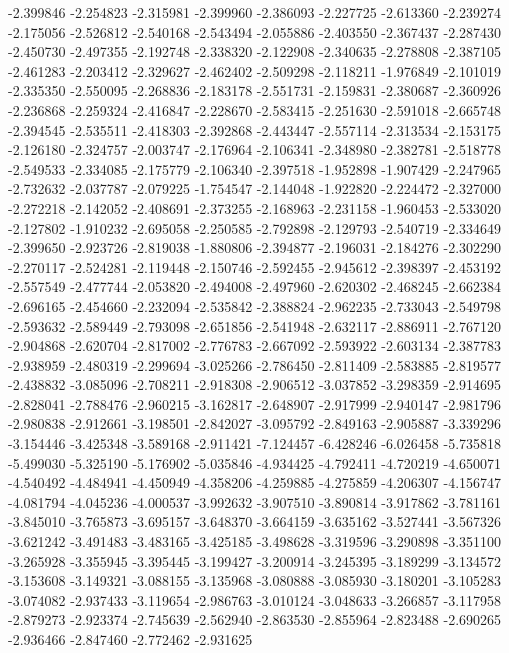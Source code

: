 -2.399846
-2.254823
-2.315981
-2.399960
-2.386093
-2.227725
-2.613360
-2.239274
-2.175056
-2.526812
-2.540168
-2.543494
-2.055886
-2.403550
-2.367437
-2.287430
-2.450730
-2.497355
-2.192748
-2.338320
-2.122908
-2.340635
-2.278808
-2.387105
-2.461283
-2.203412
-2.329627
-2.462402
-2.509298
-2.118211
-1.976849
-2.101019
-2.335350
-2.550095
-2.268836
-2.183178
-2.551731
-2.159831
-2.380687
-2.360926
-2.236868
-2.259324
-2.416847
-2.228670
-2.583415
-2.251630
-2.591018
-2.665748
-2.394545
-2.535511
-2.418303
-2.392868
-2.443447
-2.557114
-2.313534
-2.153175
-2.126180
-2.324757
-2.003747
-2.176964
-2.106341
-2.348980
-2.382781
-2.518778
-2.549533
-2.334085
-2.175779
-2.106340
-2.397518
-1.952898
-1.907429
-2.247965
-2.732632
-2.037787
-2.079225
-1.754547
-2.144048
-1.922820
-2.224472
-2.327000
-2.272218
-2.142052
-2.408691
-2.373255
-2.168963
-2.231158
-1.960453
-2.533020
-2.127802
-1.910232
-2.695058
-2.250585
-2.792898
-2.129793
-2.540719
-2.334649
-2.399650
-2.923726
-2.819038
-1.880806
-2.394877
-2.196031
-2.184276
-2.302290
-2.270117
-2.524281
-2.119448
-2.150746
-2.592455
-2.945612
-2.398397
-2.453192
-2.557549
-2.477744
-2.053820
-2.494008
-2.497960
-2.620302
-2.468245
-2.662384
-2.696165
-2.454660
-2.232094
-2.535842
-2.388824
-2.962235
-2.733043
-2.549798
-2.593632
-2.589449
-2.793098
-2.651856
-2.541948
-2.632117
-2.886911
-2.767120
-2.904868
-2.620704
-2.817002
-2.776783
-2.667092
-2.593922
-2.603134
-2.387783
-2.938959
-2.480319
-2.299694
-3.025266
-2.786450
-2.811409
-2.583885
-2.819577
-2.438832
-3.085096
-2.708211
-2.918308
-2.906512
-3.037852
-3.298359
-2.914695
-2.828041
-2.788476
-2.960215
-3.162817
-2.648907
-2.917999
-2.940147
-2.981796
-2.980838
-2.912661
-3.198501
-2.842027
-3.095792
-2.849163
-2.905887
-3.339296
-3.154446
-3.425348
-3.589168
-2.911421
-7.124457
-6.428246
-6.026458
-5.735818
-5.499030
-5.325190
-5.176902
-5.035846
-4.934425
-4.792411
-4.720219
-4.650071
-4.540492
-4.484941
-4.450949
-4.358206
-4.259885
-4.275859
-4.206307
-4.156747
-4.081794
-4.045236
-4.000537
-3.992632
-3.907510
-3.890814
-3.917862
-3.781161
-3.845010
-3.765873
-3.695157
-3.648370
-3.664159
-3.635162
-3.527441
-3.567326
-3.621242
-3.491483
-3.483165
-3.425185
-3.498628
-3.319596
-3.290898
-3.351100
-3.265928
-3.355945
-3.395445
-3.199427
-3.200914
-3.245395
-3.189299
-3.134572
-3.153608
-3.149321
-3.088155
-3.135968
-3.080888
-3.085930
-3.180201
-3.105283
-3.074082
-2.937433
-3.119654
-2.986763
-3.010124
-3.048633
-3.266857
-3.117958
-2.879273
-2.923374
-2.745639
-2.562940
-2.863530
-2.855964
-2.823488
-2.690265
-2.936466
-2.847460
-2.772462
-2.931625
